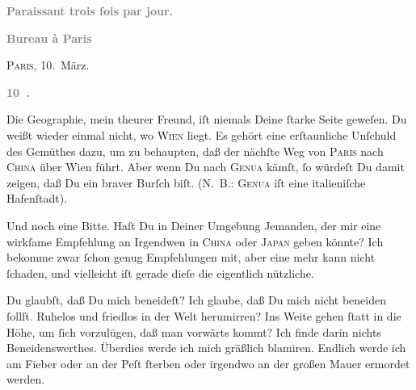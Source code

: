 \pstart
           \begin{otherlanguage}{french}\textcolor{gray}{\textbf{\textbf{Paraissant trois fois par jour.}}}\end{otherlanguage}\pend
           
\pstart
           \begin{otherlanguage}{french}\textcolor{gray}{\textbf{\textbf{Bureau à Paris}}}\end{otherlanguage}\hfill \textsc{Paris}, 10. März.\pend
           
\pstart
           \begin{otherlanguage}{french}\textcolor{gray}{\textbf{\textbf{10 .}}}\end{otherlanguage}\pend
           \vspace{0.5em}
\pstart
           Die Geographie, mein theurer Freund, iſt niemals Deine{ }ſtarke Seite geweſen. Du weißt wieder einmal nicht, wo \textsc{Wien} liegt. Es gehört eine erſtaunliche Unſchuld des Gemüthes dazu, um zu behaupten,
               daß der nächſte Weg von \textsc{Paris} nach \textsc{China} über Wien führt. Aber wenn Du nach \textsc{Genua} kämſt,{ }ſo würdeſt Du damit zeigen, daß Du ein braver Burſch biſt. \introOben{}(\textsc{N. B.: Genua} iſt eine italieniſche
                  Hafenſtadt).\introOben{}\pend
           
\pstart
           Und noch eine Bitte. Haſt Du in Deiner Umgebung Jemanden, {\pb}der mir eine wirkſame Empfehlung an Irgendwen in \textsc{China} oder \textsc{Japan} geben könnte? Ich bekomme zwar{ }ſchon genug Empfehlungen mit, aber eine mehr
               kann nicht{ }ſchaden, und vielleicht iſt gerade dieſe die eigentlich\strikeout{\textcolor{gray}{e}} nützliche.\pend
           
\pstart
           Du glaubſt, daß Du mich beneideſt? Ich glaube, daß Du mich nicht beneiden{ }ſollſt.
               Ruhelos und friedlos in der Welt herumirren?  Ins Weite gehen{ }ſtatt in die Höhe, um{ }ſich
               vorzulügen, daß man {\pb}vorwärts kommt? Ich finde darin
               nichts Beneidenswerthes. Überdies werde ich mich gräßlich  blamiren. Endlich werde ich \strikeout{\textcolor{gray}{a}} am Fieber \introOben{}oder\introOben{} an der Peſt ſterben oder irgendwo an der großen Mauer ermordet werden.\pend
           
